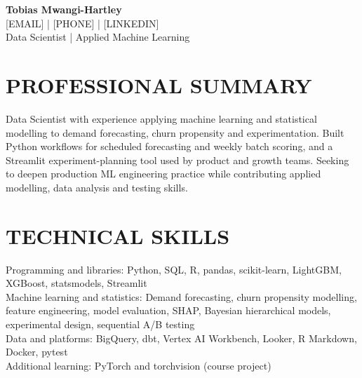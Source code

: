 \documentclass[11pt,a4paper]{article}
\begin{document}
\begin{center}
{\Huge\bfseries\color{primarycolor} Tobias Mwangi-Hartley}\\[0.35em]
{\small [EMAIL] | [PHONE] | [LINKEDIN]}\\[0.25em]
{\large\color{accentcolor} Data Scientist | Applied Machine Learning}
\end{center}
\vspace{0.5em}

\section*{PROFESSIONAL SUMMARY}
Data Scientist with experience applying machine learning and statistical modelling to demand forecasting, churn propensity and experimentation. Built Python workflows for scheduled forecasting and weekly batch scoring, and a Streamlit experiment-planning tool used by product and growth teams. Seeking to deepen production ML engineering practice while contributing applied modelling, data analysis and testing skills.

\section*{TECHNICAL SKILLS}
Programming and libraries: Python, SQL, R, pandas, scikit-learn, LightGBM, XGBoost, statsmodels, Streamlit\\
Machine learning and statistics: Demand forecasting, churn propensity modelling, feature engineering, model evaluation, SHAP, Bayesian hierarchical models, experimental design, sequential A/B testing\\
Data and platforms: BigQuery, dbt, Vertex AI Workbench, Looker, R Markdown, Docker, pytest\\
Additional learning: PyTorch and torchvision (course project)
\end{document}
